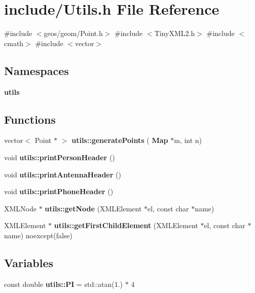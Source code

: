 \section{include/\+Utils.h File Reference}
\label{_utils_8h}
{\ttfamily \#include $<$geos/geom/\+Point.\+h$>$}\newline
{\ttfamily \#include $<$Tiny\+X\+M\+L2.\+h$>$}\newline
{\ttfamily \#include $<$cmath$>$}\newline
{\ttfamily \#include $<$vector$>$}\newline
\subsection*{Namespaces}
\begin{DoxyCompactItemize}
\item 
 \textbf{ utils}
\end{DoxyCompactItemize}
\subsection*{Functions}
\begin{DoxyCompactItemize}
\item 
vector$<$ Point $\ast$ $>$ \textbf{ utils\+::generate\+Points} (\textbf{ Map} $\ast$m, int n)
\item 
void \textbf{ utils\+::print\+Person\+Header} ()
\item 
void \textbf{ utils\+::print\+Antenna\+Header} ()
\item 
void \textbf{ utils\+::print\+Phone\+Header} ()
\item 
X\+M\+L\+Node $\ast$ \textbf{ utils\+::get\+Node} (X\+M\+L\+Element $\ast$el, const char $\ast$name)
\item 
X\+M\+L\+Element $\ast$ \textbf{ utils\+::get\+First\+Child\+Element} (X\+M\+L\+Element $\ast$el, const char $\ast$name) noexcept(false)
\end{DoxyCompactItemize}
\subsection*{Variables}
\begin{DoxyCompactItemize}
\item 
const double \textbf{ utils\+::\+PI} = std\+::atan(1.) $\ast$ 4
\end{DoxyCompactItemize}
